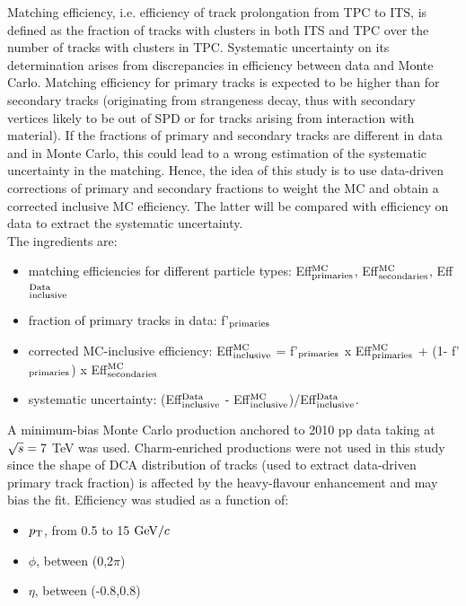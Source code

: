 Matching efficiency, i.e. efficiency of track prolongation from TPC to ITS, 
is defined as the fraction of tracks with 
clusters in both ITS and TPC over the number of tracks with clusters in TPC.
Systematic uncertainty on its determination arises from discrepancies 
in efficiency between data and Monte Carlo.
Matching efficiency for primary tracks is expected to be higher than 
for secondary tracks (originating from strangeness decay, thus 
with secondary vertices likely to be out of SPD or for tracks arising
 from interaction with material).
If the fractions of primary and secondary tracks are different in data 
and in Monte Carlo, this could lead to a wrong estimation of the systematic 
uncertainty in the matching. Hence, the idea of this study is to 
use data-driven corrections of primary and secondary fractions to weight the MC
and obtain a corrected inclusive MC efficiency. The latter will be compared 
with efficiency on data to extract the systematic uncertainty.\\
The ingredients are:
\begin{itemize}
\item matching efficiencies for different particle types: 
Eff$^{\rm MC}_{\rm primaries}$, Eff$^{\rm MC}_{\rm secondaries}$, Eff$^{\rm Data}_{\rm inclusive}$
\item fraction of primary tracks in data: f'$_{\rm primaries}$
\item corrected MC-inclusive efficiency: 
Eff$^{\rm MC}_{\rm inclusive}$ = f'$_{\rm primaries}$ x Eff$^{\rm MC}_{\rm primaries}$ + (1- f'$_{\rm primaries}$) x Eff$^{\rm MC}_{\rm secondaries}$
\item systematic uncertainty: 
(Eff$^{\rm Data}_{\rm inclusive}$ - Eff$^{\rm MC}_{\rm inclusive}$)/Eff$^{\rm Data}_{\rm inclusive}$.
\end{itemize}
A minimum-bias Monte Carlo production anchored to 2010 pp data taking at 
$\sqrt{s} = 7$ TeV was used. Charm-enriched productions were not used in this study 
since the shape of DCA distribution of tracks (used to extract data-driven 
primary track fraction) is affected by the heavy-flavour enhancement
and may bias the fit.
Efficiency was studied as a function of:
\begin{itemize}
\item $p_{\rm T}$, from 0.5 to 15 $\mathrm{GeV}/c$
\item $\phi$, between (0,2$\pi$)
\item $\eta$, between (-0.8,0.8)
\end{itemize}

